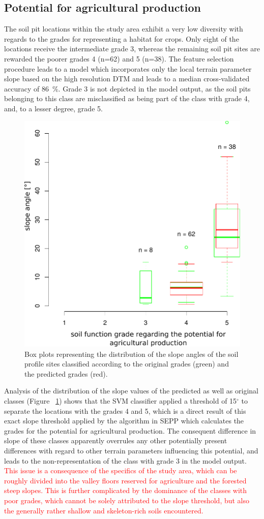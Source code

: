 \documentclass[soilsystems,article,submit,moreauthors,pdftex,10pt,a4paper]{Definitions/mdpi}
\begin{document}
\subsection{Potential for agricultural production}
The soil pit locations within the study area exhibit a very low diversity with regards to the grades for representing a habitat for crops. Only eight of the locations receive the intermediate grade 3, whereas the remaining soil pit sites are rewarded the poorer grades 4 (n=62) and 5 (n=38). The feature selection procedure leads to a model which incorporates only the local terrain parameter slope based on the high resolution DTM and leads to a median cross-validated accuracy of 86~\%. Grade 3 is not depicted in the model output, as the soil pits belonging to this class are misclassified as being part of the class with grade 4, and, to a lesser degree, grade 5. 
\begin{figure}[H]
\centering
\includegraphics[width=8 cm]{slope_agriculture.pdf}
\caption{Box plots representing the distribution of the slope angles of the soil profile sites classified according to the original grades (green) and the predicted grades (red).}
\label{fig:slope_agriculture}
\end{figure}   

Analysis of the distribution of the slope values of the predicted as well as original classes (Figure~ \ref{fig:slope_agriculture}) shows that the SVM classifier applied a threshold of 15$^\circ$ to separate the locations with the grades 4 and 5, which is a direct result of this exact slope threshold applied by the algorithm in SEPP which calculates the grades for the potential for agricultural production. The consequent difference in slope of these classes apparently overrules any other potentially present differences with regard to other terrain parameters influencing this potential, and leads to the non-representation of the class with grade 3 in the model output. \textcolor{red}{This issue is a consequence of the specifics of the study area, which can be roughly divided into the  valley floors reserved for agriculture and the forested steep slopes. This is further complicated by the dominance of the classes with poor grades, which cannot be solely attributed to the slope threshold, but also the generally rather shallow  and skeleton-rich soils encountered.}
\end{document}
